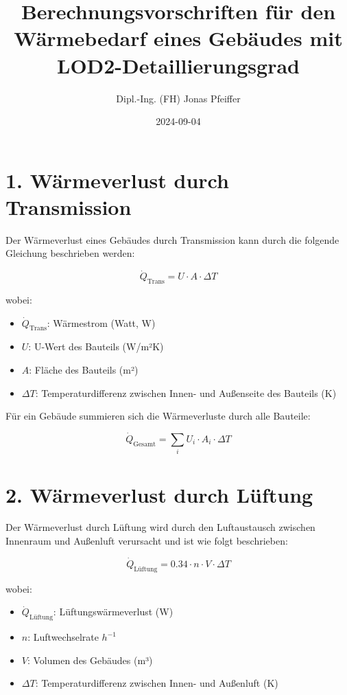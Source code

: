 \documentclass{article}
\title{Berechnungsvorschriften für den Wärmebedarf eines Gebäudes mit LOD2-Detaillierungsgrad}
\author{Dipl.-Ing. (FH) Jonas Pfeiffer}
\date{2024-09-04}
\begin{document}
\maketitle

\sloppy

\section*{1. Wärmeverlust durch Transmission}

Der Wärmeverlust eines Gebäudes durch Transmission kann durch die folgende Gleichung beschrieben werden:

\begin{equation}
\dot{Q}_\text{Trans} = U \cdot A \cdot \Delta T
\end{equation}

\noindent
wobei:
\begin{itemize}
    \item \(\dot{Q}_\text{Trans}\): Wärmestrom (Watt, W)
    \item \(U\): U-Wert des Bauteils (W/m²K)
    \item \(A\): Fläche des Bauteils (m²)
    \item \(\Delta T\): Temperaturdifferenz zwischen Innen- und Außenseite des Bauteils (K)
\end{itemize}

Für ein Gebäude summieren sich die Wärmeverluste durch alle Bauteile:

\begin{equation}
\dot{Q}_\text{Gesamt} = \sum_{i} U_i \cdot A_i \cdot \Delta T
\end{equation}

\section*{2. Wärmeverlust durch Lüftung}

Der Wärmeverlust durch Lüftung wird durch den Luftaustausch zwischen Innenraum und Außenluft verursacht und ist wie folgt beschrieben:

\begin{equation}
\dot{Q}_\text{Lüftung} = 0.34 \cdot n \cdot V \cdot \Delta T
\end{equation}

\noindent
wobei:
\begin{itemize}
    \item \(\dot{Q}_\text{Lüftung}\): Lüftungswärmeverlust (W)
    \item \(n\): Luftwechselrate \(h^{-1}\)
    \item \(V\): Volumen des Gebäudes (m³)
    \item \(\Delta T\): Temperaturdifferenz zwischen Innen- und Außenluft (K)
\end{itemize}
\end{document}
